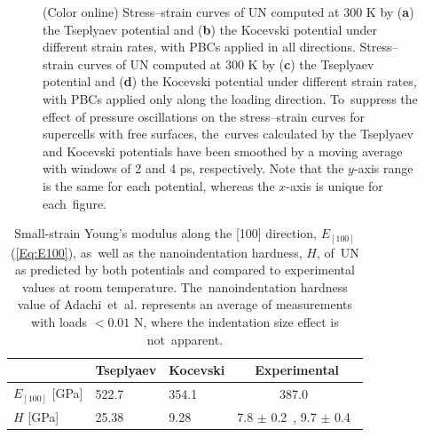 \documentclass[applsci,article,accept,pdftex,moreauthors]{Definitions/mdpi}
\newcommand{\?}{\stackrel{?}{=}}
\begin{document}
\begin{figure}[H]
\caption{(Color online) Stress--strain curves of UN computed at 300 K by (\textbf{a}) the Tseplyaev potential and (\textbf{b}) the Kocevski potential under different strain rates, with PBCs applied in all directions. Stress--strain curves of UN computed at 300 K by (\textbf{c}) the Tseplyaev potential and (\textbf{d}) the Kocevski potential under different strain rates, with PBCs applied only along the loading direction. To~suppress the effect of pressure oscillations on the stress--strain curves for supercells with free surfaces, the~curves calculated by the Tseplyaev and Kocevski potentials have been smoothed by a moving average with windows of 2 and 4 ps, respectively. Note that the $y$-axis range is the same for each potential, whereas the $x$-axis is unique for each~figure.}
\label{Fig:SS}
\end{figure}

\begin{table}[H]
\caption{Small-strain Young's modulus along the [100] direction, $E_{[100]}$ (\cref{Eq:E100}), as~well as the nanoindentation hardness, $H$, of~UN as predicted by both potentials and compared to experimental values at room temperature. The~nanoindentation hardness value of Adachi~et~al. \cite{Adachi2009} represents an average of measurements with loads $< 0.01$ N, where the indentation size effect is not~apparent.}
\begin{tabularx}{\textwidth}{CCCc} 
\toprule
                    & \textbf{Tseplyaev}     & \textbf{Kocevski}  & \textbf{Experimental} \\
\midrule
$E_{[100]}$ [GPa]   & 522.7         & 354.1     & 387.0~\cite{Salleh1986}   \\
$H$ [GPa]           & 25.38         & 9.28      & 7.8 $\pm$ 0.2~\cite{Frazer2021}, 9.7 $\pm$ 0.4~\cite{Adachi2009}    \\
\bottomrule
\end{tabularx}
\label{Tab:E100}
\end{table}

\end{document}
